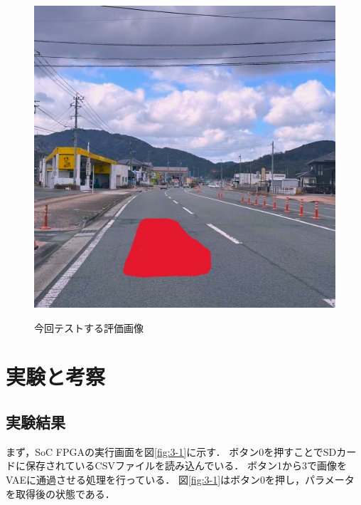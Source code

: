\documentclass[paper]{ieicej}
\begin{document}
\begin{figure}[tb]
\begin{minipage}[]{0.32\linewidth}
    \label{fig:2-3-3}
  \end{minipage}
  \begin{minipage}[]{0.32\linewidth}
    \centering
    \includegraphics[width=0.9\columnwidth]{figures/Ex_pr3.png}
    \label{fig:2-3-4}
  \end{minipage}
  \caption{今回テストする評価画像}
  \label{fig:2-3-1}
\end{figure}

\section{実験と考察}
\subsection{実験結果}
まず，SoC FPGAの実行画面を図\ref{fig:3-1}に示す．
ボタン0を押すことでSDカードに保存されているCSVファイルを読み込んでいる．
ボタン1から3で画像をVAEに通過させる処理を行っている．
図\ref{fig:3-1}はボタン0を押し，パラメータを取得後の状態である．
\end{document}
